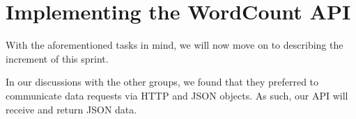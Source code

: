 \section{Implementing the WordCount API}
With the aforementioned tasks in mind, we will now move on to describing the increment of this sprint.

In our discussions with the other groups, we found that they preferred to communicate data requests via HTTP and JSON objects. As such, our API will receive and return JSON data.






